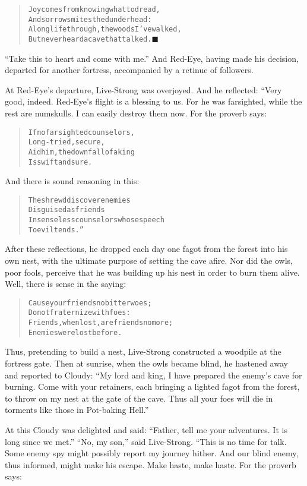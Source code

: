 \documentclass[article, twoside, 14pt]{memoir}
\newcommand{\qed}{\hfill \ensuremath{\blacksquare}}
\renewenvironment{verbatim}{%
\begin{quote}%
\vskip -10pt%
\begin{alltt}\normalfont\large}{\end{alltt}%
\end{quote}%
\vskip -10pt
} %
\begin{document}
\begin{verbatim}
Joy comes from knowing what to dread,
And sorrow smites the dunderhead:
A long life through, the woods I've walked,
But never heard a cave that talked.\hyperref[s62]{\qed}
\end{verbatim}
``Take this to heart and come with me.'' And Red-Eye, having made
his decision, departed for another fortress, accompanied by a
retinue of followers.

At Red-Eye's departure, Live-Strong was overjoyed. And he
reflected: “Very good, indeed. Red-Eye's flight is a blessing to
us. For he was farsighted, while the rest are numskulls. I can
easily destroy them now. For the proverb says:

\begin{verbatim}
If no farsighted counselors,
    Long-tried, secure,
Aid him, the downfall of a king
    Is swift and sure.
\end{verbatim}
And there is sound reasoning in this:

\begin{verbatim}
The shrewd discover enemies
    Disguised as friends
In senseless counselors whose speech
    To evil tends.”
\end{verbatim}
After these reflections, he dropped each day one fagot from the
forest into his own nest, with the ultimate purpose of setting the
cave afire. Nor did the owls, poor fools, perceive that he was
building up his nest in order to burn them alive. Well, there is
sense in the saying:

\begin{verbatim}
Cause your friends no bitter woes;
Do not fraternize with foes:
Friends, when lost, are friends no more;
Enemies were lost before.
\end{verbatim}
Thus, pretending to build a nest, Live-Strong constructed a
woodpile at the fortress gate. Then at sunrise, when the owls
became blind, he hastened away and reported to Cloudy:
``My lord and king, I have prepared the enemy's cave for burning. Come with your retainers, each bringing a lighted fagot from the forest, to throw on my nest at the gate of the cave. Thus all your foes will die in torments like those in Pot-baking Hell.''

At this Cloudy was delighted and said:
``Father, tell me your adventures. It is long since we met.''
``No, my son,'' said Live-Strong. “This is no time for talk. Some
enemy spy might possibly report my journey hither. And our blind
enemy, thus informed, might make his escape. Make haste, make
haste. For the proverb says:
\end{document}
